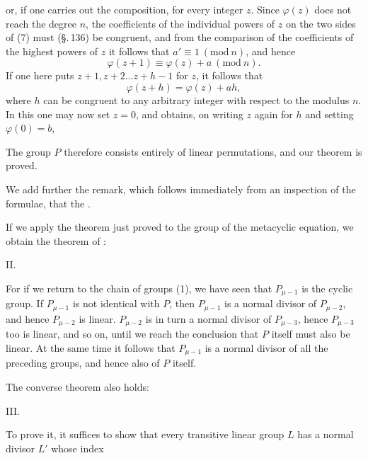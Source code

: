 
or, if one carries out the composition,
for every integer $z$. Since $\varphi(z)$ does not reach the degree $n$, the coefficients of the individual powers of $z$ on the two sides of (7) must (\S.\,136) be congruent, and from the comparison of the coefficients of the highest powers of $z$ it follows that $a' \equiv 1\ (\mathrm{mod}\ n)$, and hence
\[
\varphi(z + 1) \equiv \varphi(z) + a\ (\mathrm{mod}\ n).
\]
If one here puts $z + 1, z + 2 \ldots z + h - 1$ for $z$, it follows that
\[
\varphi(z + h) = \varphi(z) + ah,
\]
where $h$ can be congruent to any arbitrary integer with respect to the modulus $n$. In this one may now set $z = 0$, and obtains, on writing $z$ again for $h$ and setting $\varphi(0) = b$,

The group $P$ therefore consists entirely of linear permutations, and our theorem is proved.

We add further the remark, which follows immediately from an inspection of the formulae, that the .

If we apply the theorem just proved to the group of the metacyclic equation, we obtain the theorem of :

II. 

For if we return to the chain of groups (1), we have seen that $P_{\mu - 1}$ is the cyclic group. If $P_{\mu - 1}$ is not identical with $P$, then $P_{\mu - 1}$ is a normal divisor of $P_{\mu - 2}$, and hence $P_{\mu - 2}$ is linear. $P_{\mu - 2}$ is in turn a normal divisor of $P_{\mu - 3}$, hence $P_{\mu - 3}$ too is linear, and so on, until we reach the conclusion that $P$ itself must also be linear. At the same time it follows that $P_{\mu - 1}$ is a normal divisor of all the preceding groups, and hence also of $P$ itself.

The converse theorem also holds:

III. 

To prove it, it suffices to show that every transitive linear group $L$ has a normal divisor $L'$ whose index
